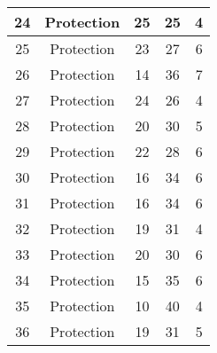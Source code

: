 \documentclass[results.tex]{subfiles}
\begin{document}
\begin{center}
\begin{tabular}{| c || c | c | c | c |}
            \hline
            24                      & Protection                   & 25                     & 25                      & 4                    \\
            \hline
            25                      & Protection                   & 23                     & 27                      & 6                    \\
            \hline
            26                      & Protection                   & 14                     & 36                      & 7                    \\
            \hline
            27                      & Protection                   & 24                     & 26                      & 4                    \\
            \hline
            28                      & Protection                   & 20                     & 30                      & 5                    \\
            \hline
            29                      & Protection                   & 22                     & 28                      & 6                    \\
            \hline
            30                      & Protection                   & 16                     & 34                      & 6                    \\
            \hline
            31                      & Protection                   & 16                     & 34                      & 6                    \\
            \hline
            32                      & Protection                   & 19                     & 31                      & 4                    \\
            \hline
            33                      & Protection                   & 20                     & 30                      & 6                    \\
            \hline
            34                      & Protection                   & 15                     & 35                      & 6                    \\
            \hline
            35                      & Protection                   & 10                     & 40                      & 4                    \\
            \hline
            36                      & Protection                   & 19                     & 31                      & 5                    \\

\end{tabular}
\end{center}
\end{document}

